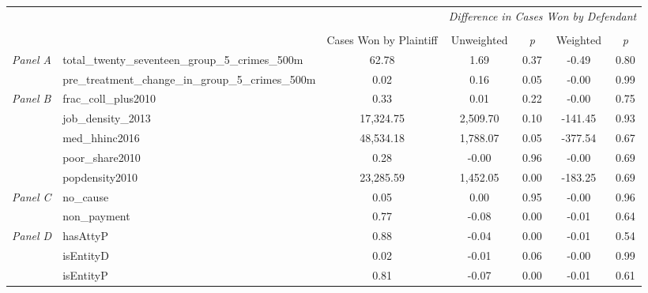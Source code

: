 \begin{tabular}{llccccc}
\toprule
 &  & \textit{} & \multicolumn{4}{c}{\textit{Difference in Cases Won by Defendant}} \\
\cline{4-7}
\\
 &  & Cases Won by Plaintiff & Unweighted & \emph{p} & Weighted & \emph{p} \\
\midrule
\multirow[c]{2}{3cm}{\textit{Panel A}} & total_twenty_seventeen_group_5_crimes_500m & 62.78 & 1.69 & 0.37 & -0.49 & 0.80 \\
 & pre_treatment_change_in_group_5_crimes_500m & 0.02 & 0.16 & 0.05 & -0.00 & 0.99 \\
\cline{1-7}
\multirow[c]{5}{3cm}{\textit{Panel B}} & frac_coll_plus2010 & 0.33 & 0.01 & 0.22 & -0.00 & 0.75 \\
 & job_density_2013 & 17,324.75 & 2,509.70 & 0.10 & -141.45 & 0.93 \\
 & med_hhinc2016 & 48,534.18 & 1,788.07 & 0.05 & -377.54 & 0.67 \\
 & poor_share2010 & 0.28 & -0.00 & 0.96 & -0.00 & 0.69 \\
 & popdensity2010 & 23,285.59 & 1,452.05 & 0.00 & -183.25 & 0.69 \\
\cline{1-7}
\multirow[c]{2}{3cm}{\textit{Panel C}} & no_cause & 0.05 & 0.00 & 0.95 & -0.00 & 0.96 \\
 & non_payment & 0.77 & -0.08 & 0.00 & -0.01 & 0.64 \\
\cline{1-7}
\multirow[c]{3}{3cm}{\textit{Panel D}} & hasAttyP & 0.88 & -0.04 & 0.00 & -0.01 & 0.54 \\
 & isEntityD & 0.02 & -0.01 & 0.06 & -0.00 & 0.99 \\
 & isEntityP & 0.81 & -0.07 & 0.00 & -0.01 & 0.61 \\
\cline{1-7}
\bottomrule
\end{tabular}
